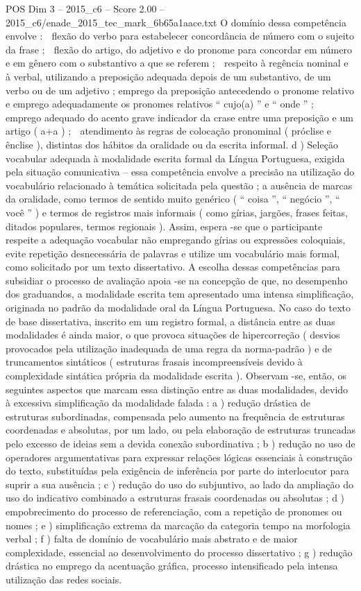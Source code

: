 \begin{textsample}{POS Dim 3 – 2015\_c6 – Score 2.00 – 2015\_c6/enade\_2015\_tec\_mark\_6b65a1aace.txt}
O domínio dessa competência envolve :  flexão do verbo para estabelecer concordância de número com o sujeito da frase ;  flexão do artigo, do adjetivo e do pronome para concordar em número e em gênero com o substantivo a que se referem ;  respeito à regência nominal e à verbal, utilizando a preposição adequada depois de um substantivo, de um verbo ou de um adjetivo ; emprego da preposição antecedendo o pronome relativo e emprego adequadamente os pronomes relativos “ cujo(a) ” e “ onde ” ;  emprego adequado do acento grave indicador da crase entre uma preposição e um artigo ( a+a ) ;  atendimento às regras de colocação pronominal ( próclise e ênclise ), distintas dos hábitos da oralidade ou da escrita informal. d ) Seleção vocabular adequada à modalidade escrita formal da Língua Portuguesa, exigida pela situação comunicativa – essa competência envolve a precisão na utilização do vocabulário relacionado à temática solicitada pela questão ; a ausência de marcas da oralidade, como termos de sentido muito genérico ( “ coisa ”, “ negócio ”, “ você ” ) e termos de registros mais informais ( como gírias, jargões, frases feitas, ditados populares, termos regionais ).
Assim, espera -se que o participante respeite a adequação vocabular não empregando gírias ou expressões coloquiais, evite repetição desnecessária de palavras e utilize um vocabulário mais formal, como solicitado por um texto dissertativo.
A escolha dessas competências para subsidiar o processo de avaliação apoia -se na concepção de que, no desempenho dos graduandos, a modalidade escrita tem apresentado uma intensa simplificação, originada no padrão da modalidade oral da Língua Portuguesa.
No caso do texto de base dissertativa, inscrito em um registro formal, a distância entre as duas modalidades é ainda maior, o que provoca situações de hipercorreção ( desvios provocados pela utilização inadequada de uma regra da norma-padrão ) e de truncamentos sintáticos ( estruturas frasais incompreensíveis devido à complexidade sintática própria da modalidade escrita ).
Observam -se, então, os seguintes aspectos que marcam essa distinção entre as duas modalidades, devido à excessiva simplificação da modalidade falada : a ) redução drástica de estruturas subordinadas, compensada pelo aumento na frequência de estruturas coordenadas e absolutas, por um lado, ou pela elaboração de estruturas truncadas pelo excesso de ideias sem a devida conexão subordinativa ; b ) redução no uso de operadores argumentativas para expressar relações lógicas essenciais à construção do texto, substituídas pela exigência de inferência por parte do interlocutor para suprir a sua ausência ; c ) redução do uso do subjuntivo, ao lado da ampliação do uso do indicativo combinado a estruturas frasais coordenadas ou absolutas ; d ) empobrecimento do processo de referenciação, com a repetição de pronomes ou nomes ; e ) simplificação extrema da marcação da categoria tempo na morfologia verbal ; f ) falta de domínio de vocabulário mais abstrato e de maior complexidade, essencial ao desenvolvimento do processo dissertativo ; g ) redução drástica no emprego da acentuação gráfica, processo intensificado pela intensa utilização das redes sociais.

\end{textsample}
